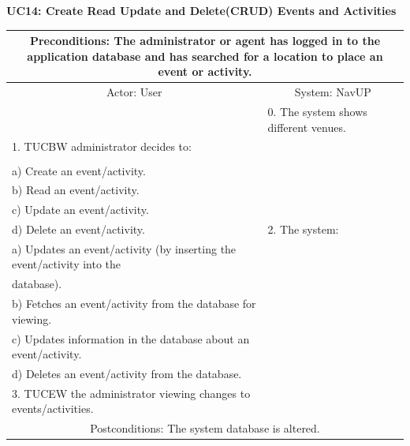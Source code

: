 \documentclass{article}
\begin{document}
     \newpage
     
				\vspace{5mm}
                \begin{flushleft}
				\textbf{UC14: Create Read Update and Delete(CRUD) Events and Activities}\\
                \end{flushleft}
        		\centering	
       		 \small
       		 \begin{tabular}{|p{8cm}|p{8cm}|}
       		 \hline
       		 \multicolumn{2}{c}{Preconditions: The administrator or agent has logged in to the application database and has searched for a location to place an event or activity.} \\
       		 \hline
       		\multicolumn{1}{c}{Actor: User} & \multicolumn{1}{c}{ System: NavUP} \\
        		\hline
       		 & 0.	The system shows different venues.\\
       		 \hline
       		1.	TUCBW administrator decides to:\\

\\a)	Create an event/activity.
\\b)	Read an event/activity.
\\c)	Update an event/activity.
\\d)	Delete an event/activity.
 &2.	The system:

\\a)	Updates an event/activity (by inserting the event/activity into the \\database).
\\b)	Fetches an event/activity from the database for viewing.
\\c)	Updates information in the database about an event/activity.
\\d)	Deletes an event/activity from the database.
\\
        		\hline
       		3.	TUCEW the administrator viewing changes to events/activities.&\\
       		 \hline
        		\multicolumn{2}{c}{Postconditions: The system database is altered.}  \\
        		\hline
        \end{tabular} 
   
\end{document}

